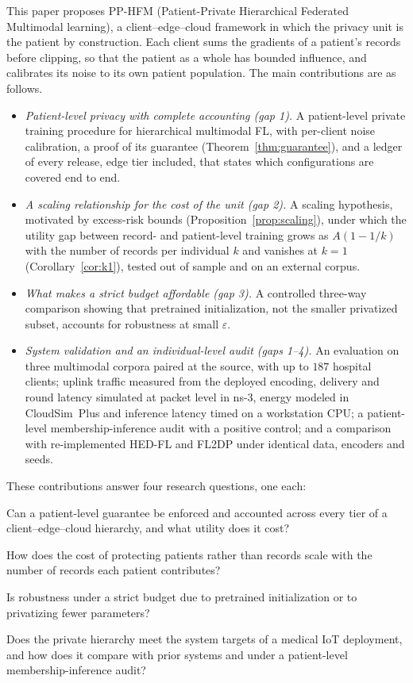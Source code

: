This paper proposes PP-HFM (Patient-Private Hierarchical Federated Multimodal
learning), a client--edge--cloud framework in which the privacy unit is the
patient by construction. Each client sums the gradients of a patient's records
before clipping, so that the patient as a whole has bounded influence, and
calibrates its noise to its own patient population. The main contributions
are as follows.
\begin{itemize}
\item \emph{Patient-level privacy with complete accounting (gap 1).} A
patient-level private training procedure for hierarchical multimodal FL, with
per-client noise calibration, a proof of its guarantee
(Theorem~\ref{thm:guarantee}), and a ledger of every release, edge tier
included, that states which configurations are covered end to end.
\item \emph{A scaling relationship for the cost of the unit (gap 2).} A scaling hypothesis,
motivated by excess-risk bounds (Proposition~\ref{prop:scaling}), under which
the utility gap between record- and patient-level training grows as
$A(1 - 1/k)$ with the number of records per individual $k$ and vanishes at
$k = 1$ (Corollary~\ref{cor:k1}), tested out of sample and on an external
corpus.
\item \emph{What makes a strict budget affordable (gap 3).} A controlled three-way comparison
showing that pretrained initialization, not the smaller privatized subset,
accounts for robustness at small $\varepsilon$.
\item \emph{System validation and an individual-level audit (gaps 1--4).} An
evaluation on three multimodal corpora paired at the source, with up to $187$
hospital clients; uplink traffic measured from the deployed encoding, delivery
and round latency simulated at packet level in ns-3, energy modeled in
CloudSim~Plus and inference latency timed on a workstation CPU; a patient-level membership-inference audit with a positive control;
and a comparison with re-implemented HED-FL and FL2DP under identical data,
encoders and seeds.
\end{itemize}
These contributions answer four research questions, one each:
\begin{IEEEdescription}[\IEEEsetlabelwidth{RQ4:}]
\item[RQ1:] Can a patient-level guarantee be enforced and accounted across
every tier of a client--edge--cloud hierarchy, and what utility does it cost?
\item[RQ2:] How does the cost of protecting patients rather than records
scale with the number of records each patient contributes?
\item[RQ3:] Is robustness under a strict budget due to pretrained
initialization or to privatizing fewer parameters?
\item[RQ4:] Does the private hierarchy meet the system targets of a medical
IoT deployment, and how does it compare with prior systems and under a
patient-level membership-inference audit?
\end{IEEEdescription}
